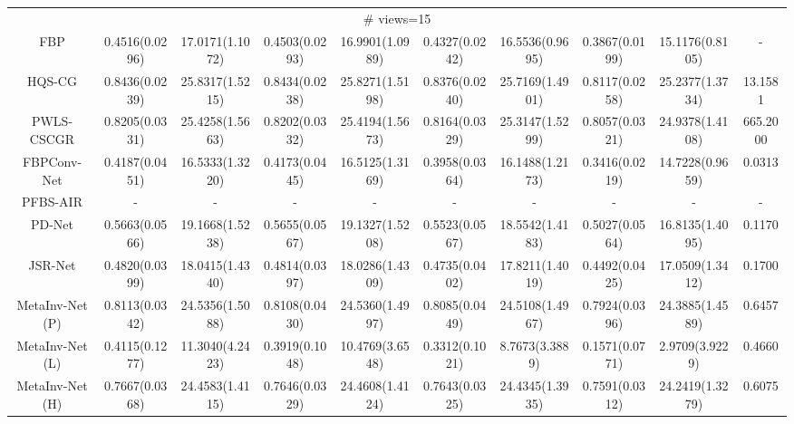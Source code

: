 \documentclass[journal,twoside]{IEEEtran}
\begin{document}
\begin{table*}[ht]
\begin{tabular}{|c|c|c|c|c|c|c|c|c|c|}
 \multicolumn{10}{|c|}{\cellcolor{gbygreen}\# views=15} \\
  \cline{1-10}
  FBP 
 &0.4516(0.0296) &17.0171(1.1072) 
 &0.4503(0.0293) &16.9901(1.0989) 
 &0.4327(0.0242) &16.5536(0.9695)
 &0.3867(0.0199) &15.1176(0.8105) &-\\
  \cline{1-10}
 HQS-CG 
&\cellcolor{gbypink}0.8436(0.0239) &\cellcolor{gbypink}25.8317(1.5215) 
&\cellcolor{gbypink}0.8434(0.0238) &\cellcolor{gbypink}25.8271(1.5198) 
&\cellcolor{gbypink}0.8376(0.0240) &\cellcolor{gbypink}25.7169(1.4901) 
&\cellcolor{gbypink}0.8117(0.0258) &\cellcolor{gbypink}25.2377(1.3734) &13.1581\\
  \cline{1-10}
PWLS-CSCGR 
&\cellcolor{gbyblue}0.8205(0.0331) &\cellcolor{gbyblue}25.4258(1.5663) 
&\cellcolor{gbyblue}0.8202(0.0332) &\cellcolor{gbyblue}25.4194(1.5673) 
&\cellcolor{gbyblue}0.8164(0.0329) &\cellcolor{gbyblue}25.3147(1.5299) 
&\cellcolor{gbyblue}0.8057(0.0321) &\cellcolor{gbyblue}24.9378(1.4108) &665.2000\\
    \cline{1-10}
 FBPConv-Net 
&0.4187(0.0451) &16.5333(1.3220) 
&0.4173(0.0445) &16.5125(1.3169) 
&0.3958(0.0364) &16.1488(1.2173) 
&0.3416(0.0219) &14.7228(0.9659) &0.0313\\
    \cline{1-10}
PFBS-AIR 
   &- &- &- &- &- &- &- &- &-\\
    \cline{1-10}
 PD-Net 
&0.5663(0.0566) &19.1668(1.5238) 
&0.5655(0.0567) &19.1327(1.5208) 
&0.5523(0.0567) &18.5542(1.4183) 
&0.5027(0.0564) &16.8135(1.4095) &0.1170\\
  \cline{1-10}
JSR-Net 
&0.4820(0.0399) &18.0415(1.4340) 
&0.4814(0.0397) &18.0286(1.4309) 
&0.4735(0.0402) &17.8211(1.4019) 
&0.4492(0.0425) &17.0509(1.3412) &0.1700\\
  \cline{1-10}
  MetaInv-Net (P)
&0.8113(0.0342) &24.5356(1.5088) 
&0.8108(0.0430) &24.5360(1.4997) 
&0.8085(0.0449) &24.5108(1.4967) 
&0.7924(0.0396) &24.3885(1.4589) &0.6457\\
  \cline{1-10}
MetaInv-Net (L) 
&0.4115(0.1277) &11.3040(4.2423) 
&0.3919(0.1048) &10.4769(3.6548) 
&0.3312(0.1021) &8.7673(3.3889) 
&0.1571(0.0771) &2.9709(3.9229) &0.4660\\  
  \cline{1-10}
 MetaInv-Net (H) 
&0.7667(0.0368) &24.4583(1.4115) 
&0.7646(0.0329) &24.4608(1.4124) 
&0.7643(0.0325) &24.4345(1.3935) 
&0.7591(0.0312) &24.2419(1.3279) &0.6075\\
  \cline{1-10}
  

\end{tabular}
\end{table*}
\end{document}
